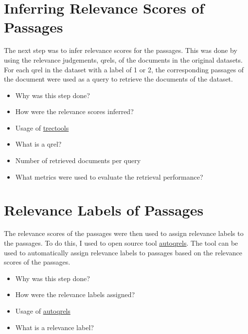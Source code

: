 \section{Inferring Relevance Scores of Passages}\label{inferring-relevance-scores-of-passages}

The next step was to infer relevance scores for the passages. This was done by using the relevance judgements, qrels, of the documents in the original datasets. For each qrel in the dataset with a label of 1 or 2, the corresponding passages of the document were used as a query to retrieve the documents of the dataset. 

\begin{itemize}
    \item Why was this step done?
    \item How were the relevance scores inferred?
    \item Usage of \href{https://github.com/joaopalotti/trectools}{trectools}
    \item What is a qrel?
    \item Number of retrieved documents per query
    \item What metrics were used to evaluate the retrieval performance?
\end{itemize}

\section{Relevance Labels of Passages}\label{relevance-labels-of-passages}

The relevance scores of the passages were then used to assign relevance labels to the passages. To do this, I used to open source tool \href{https://github.com/seanmacavaney/autoqrels}{autoqrels}. The tool can be used to automatically assign relevance labels to passages based on the relevance scores of the passages.

\begin{itemize}
    \item Why was this step done?
    \item How were the relevance labels assigned?
    \item Usage of \href{https://github.com/seanmacavaney/autoqrels}{autoqrels}
    \item What is a relevance label?
\end{itemize}